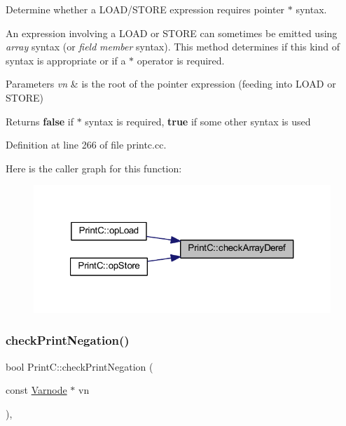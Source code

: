 Determine whether a L\+O\+A\+D/\+S\+T\+O\+RE expression requires pointer \textquotesingle{}$\ast$\textquotesingle{} syntax. 

An expression involving a L\+O\+AD or S\+T\+O\+RE can sometimes be emitted using {\itshape array} syntax (or {\itshape field} {\itshape member} syntax). This method determines if this kind of syntax is appropriate or if a \textquotesingle{}$\ast$\textquotesingle{} operator is required. 
\begin{DoxyParams}{Parameters}
{\em vn} & is the root of the pointer expression (feeding into L\+O\+AD or S\+T\+O\+RE) \\
\hline
\end{DoxyParams}
\begin{DoxyReturn}{Returns}
{\bfseries{false}} if \textquotesingle{}$\ast$\textquotesingle{} syntax is required, {\bfseries{true}} if some other syntax is used 
\end{DoxyReturn}


Definition at line 266 of file printc.\+cc.

Here is the caller graph for this function\+:
\nopagebreak
\begin{figure}[H]
\begin{center}
\leavevmode
\includegraphics[width=321pt]{class_print_c_adb5d1d809d390a69943576628118b83b_icgraph}
\end{center}
\end{figure}
\mbox{\label{class_print_c_ad1f1099f49b4169948682a34c5b9f9cb}} 
\subsubsection{\texorpdfstring{checkPrintNegation()}{checkPrintNegation()}}
{\footnotesize\ttfamily bool Print\+C\+::check\+Print\+Negation (\begin{DoxyParamCaption}\item[{const \mbox{\hyperlink{class_varnode}{Varnode}} $\ast$}]{vn }\end{DoxyParamCaption})\hspace{0.3cm}{\ttfamily [protected]}, {\ttfamily [virtual]}}




